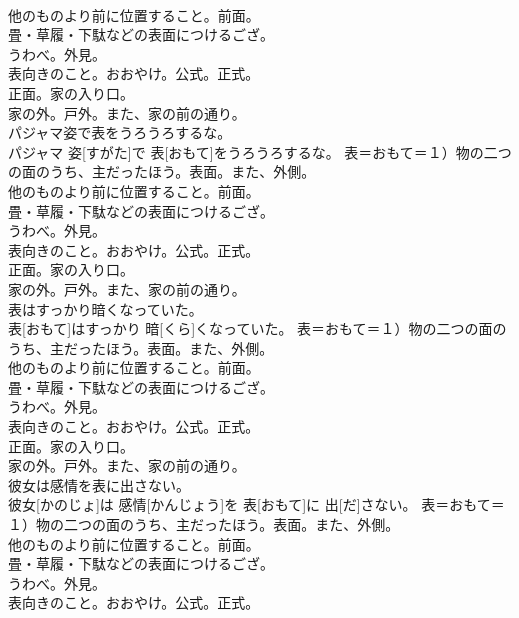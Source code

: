 \documentclass[8pt]{extreport}
\begin{document}
\begin{CJK}{UTF8}{min}
{\\	他のものより前に位置すること。前面。 　　　　　　
\\	畳・草履・下駄などの表面につけるござ。 　　　　　　
\\	うわべ。外見。 　　　　　　
\\	表向きのこと。おおやけ。公式。正式。 　　　　　　
\\	正面。家の入り口。 　　　　　　
\\	家の外。戸外。また、家の前の通り。
\\	パジャマ姿で表をうろうろするな。	
\\	パジャマ 姿[すがた]で 表[おもて]をうろうろするな。	表＝おもて＝１）物の二つの面のうち、主だったほう。表面。また、外側。 　　　　　　
\\	他のものより前に位置すること。前面。 　　　　　　
\\	畳・草履・下駄などの表面につけるござ。 　　　　　　
\\	うわべ。外見。 　　　　　　
\\	表向きのこと。おおやけ。公式。正式。 　　　　　　
\\	正面。家の入り口。 　　　　　　
\\	家の外。戸外。また、家の前の通り。
\\	表はすっかり暗くなっていた。	
\\	表[おもて]はすっかり 暗[くら]くなっていた。	表＝おもて＝１）物の二つの面のうち、主だったほう。表面。また、外側。 　　　　　　
\\	他のものより前に位置すること。前面。 　　　　　　
\\	畳・草履・下駄などの表面につけるござ。 　　　　　　
\\	うわべ。外見。 　　　　　　
\\	表向きのこと。おおやけ。公式。正式。 　　　　　　
\\	正面。家の入り口。 　　　　　　
\\	家の外。戸外。また、家の前の通り。
\\	彼女は感情を表に出さない。	
\\	彼女[かのじょ]は 感情[かんじょう]を 表[おもて]に 出[だ]さない。	表＝おもて＝１）物の二つの面のうち、主だったほう。表面。また、外側。 　　　　　　
\\	他のものより前に位置すること。前面。 　　　　　　
\\	畳・草履・下駄などの表面につけるござ。 　　　　　　
\\	うわべ。外見。 　　　　　　
\\	表向きのこと。おおやけ。公式。正式。 　　　　　　
}
\end{CJK}
\end{document}
